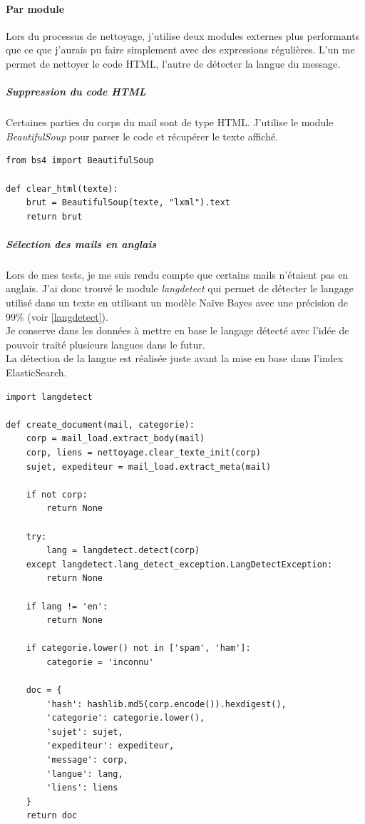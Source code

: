 \documentclass[a4paper,12pt]{article}
\begin{document}
 
			\paragraph{Par module}
				Lors du processus de nettoyage, j'utilise deux modules externes plus performants que ce que j'aurais pu faire simplement avec des expressions régulières. L'un me permet de nettoyer le code HTML, l'autre de détecter la langue du message. 
				
				\subparagraph{Suppression du code HTML} Certaines parties du corps du mail sont de type HTML. J'utilise le module \emph{BeautifulSoup} pour parser le code et récupérer le texte affiché. 
		
					\begin{lstlisting}[title=Nettoyage des nombres]		
from bs4 import BeautifulSoup

def clear_html(texte):
    brut = BeautifulSoup(texte, "lxml").text
    return brut \end{lstlisting}	
    		
				\subparagraph{Sélection des mails en anglais} Lors de mes tests, je me suis rendu compte que certains mails n'étaient pas en anglais. J'ai donc trouvé le module \emph{langdetect} qui permet de détecter le langage utilisé dans un texte en utilisant un modèle Naïve Bayes avec une précision de 99\% (voir \ref{langdetect}). \\
				Je conserve dans les données à mettre en base le langage détecté avec l'idée de pouvoir traité plusieurs langues dans le futur.\\
				
				La détection de la langue est réalisée juste avant la mise en base dans l'index ElasticSearch.
				
				\begin{lstlisting}[title=Création d'un document]	
import langdetect

def create_document(mail, categorie):
    corp = mail_load.extract_body(mail)
    corp, liens = nettoyage.clear_texte_init(corp)
    sujet, expediteur = mail_load.extract_meta(mail)

    if not corp:
        return None

    try:
        lang = langdetect.detect(corp)
    except langdetect.lang_detect_exception.LangDetectException:
        return None

    if lang != 'en':
        return None

    if categorie.lower() not in ['spam', 'ham']:
        categorie = 'inconnu'

    doc = {
        'hash': hashlib.md5(corp.encode()).hexdigest(),
        'categorie': categorie.lower(),
        'sujet': sujet,
        'expediteur': expediteur,
        'message': corp,
        'langue': lang,
        'liens': liens
    }
    return doc \end{lstlisting}
 
\end{document}
